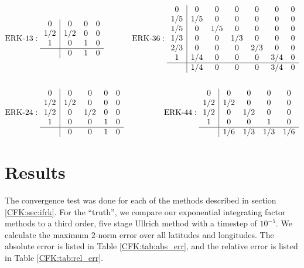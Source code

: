 \documentclass{csri19}
\begin{document}
\begin{align*}&\text{ERK-}13:
 \begin{array}{c|ccc}
0   & 0   & 0 & 0\\
1/2 & 1/2 & 0 & 0\\
1   & 0   & 1 & 0\\
\hline
    & 0   & 1 & 0
\end{array}
& \text{ERK-}36: 
\begin{array}{c|cccccc}
0   & 0   & 0   & 0   & 0   & 0   & 0\\
1/5 & 1/5 & 0   & 0   & 0   & 0   & 0\\
1/5 & 0   & 1/5 & 0   & 0   & 0   & 0\\
1/3 & 0   & 0   & 1/3 & 0   & 0   & 0\\
2/3 & 0   & 0   & 0   & 2/3 & 0   & 0\\
1   & 1/4 & 0   & 0   & 0   & 3/4 & 0\\
\hline
    & 1/4 & 0   & 0   & 0   & 3/4 & 0
\end{array}\\
\\
&\text{ERK-}24: 
\begin{array}{c|cccc}
0   & 0   & 0   & 0 & 0\\
1/2 & 1/2 & 0   & 0 & 0\\
1/2 & 0   & 1/2 & 0 & 0\\
1   & 0   & 0   & 1 & 0\\
\hline
    & 0   & 0   & 1 & 0
\end{array}
& \text{ERK-}44: 
\begin{array}{c|cccc}
0   & 0   & 0   & 0   & 0 \\
1/2 & 1/2 & 0   & 0   & 0 \\
1/2 & 0   & 1/2 & 0   & 0 \\
1   & 0   & 0   & 1   & 0 \\
\hline
    & 1/6 & 1/3 & 1/3 & 1/6
\end{array} 
\end{align*}

\section{Results}\label{CFK:sec:results}
The convergence test was done for each of the methods described in section
 \ref{CFK:sec:ifrk}. For the ``truth'', we compare our 
exponential integrating factor methods to a third order, five stage 
Ullrich method with a timestep of $10^{-5}$. We calculate the maximum 
$2$-norm error over all latitudes and longitudes. The absolute error is
listed in Table \ref{CFK:tab:abs_err}, and the relative error is listed
in Table \ref{CFK:tab:rel_err}.
\end{document}
